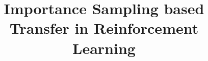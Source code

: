 \documentclass[11pt, a4paper, twoside, openright, titlepage]{book}
\title{Importance Sampling based Transfer in Reinforcement Learning}
\begin{document}
  \maketitle

  
  
  
  
  

  \cleardoublepage


  
  
  
  
  
  
  

  \printbibliography

  \begin{appendices}
      
      
  \end{appendices}
\end{document}

